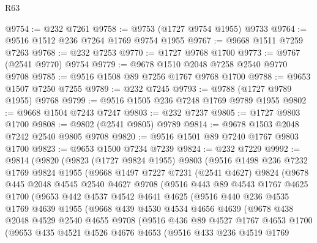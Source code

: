 \begin{lexlean}{R63}
\begin{coremodule}
@9754 := @232 @7261
@9758 := @9753 (@1727 @9754 @1955) @9733
@9764 := @9516 @1512 @236 @7264 @1769 @9754 @1955
@9767 := @9668 @1511 @7259 @7263
@9768 := @232 @7253
@9770 := @1727 @9768 @1700
@9773 := @9767 (@2541 @9770) @9754
@9779 := @9678 @1510 @2048 @7258 @2540 @9770 @9708
@9785 := @9516 @1508 @89 @7256 @1767 @9768 @1700
@9788 := @9653 @1507 @7250 @7255
@9789 := @232 @7245
@9793 := @9788 (@1727 @9789 @1955) @9768
@9799 := @9516 @1505 @236 @7248 @1769 @9789 @1955
@9802 := @9668 @1504 @7243 @7247
@9803 := @232 @7237
@9805 := @1727 @9803 @1700
@9808 := @9802 (@2541 @9805) @9789
@9814 := @9678 @1503 @2048 @7242 @2540 @9805 @9708
@9820 := @9516 @1501 @89 @7240 @1767 @9803 @1700
@9823 := @9653 @1500 @7234 @7239
@9824 := @232 @7229
@9992 := @9814
    (@9820
      (@9823
        (@1727 @9824 @1955)
        @9803
        (@9516
          @1498
          @236
          @7232
          @1769
          @9824
          @1955
          (@9668
            @1497
            @7227
            @7231
            (@2541 @4627)
            @9824
            (@9678
              @445
              @2048
              @4545
              @2540
              @4627
              @9708
              (@9516
                @443
                @89
                @4543
                @1767
                @4625
                @1700
                (@9653
                  @442
                  @4537
                  @4542
                  @4641
                  @4625
                  (@9516
                    @440
                    @236
                    @4535
                    @1769
                    @4639
                    @1955
                    (@9668
                      @439
                      @4530
                      @4534
                      @4656
                      @4639
                      (@9678
                        @438
                        @2048
                        @4529
                        @2540
                        @4655
                        @9708
                        (@9516
                          @436
                          @89
                          @4527
                          @1767
                          @4653
                          @1700
                          (@9653
                            @435
                            @4521
                            @4526
                            @4676
                            @4653
                            (@9516
                              @433
                              @236
                              @4519
                              @1769

\end{coremodule}
\end{lexlean}
